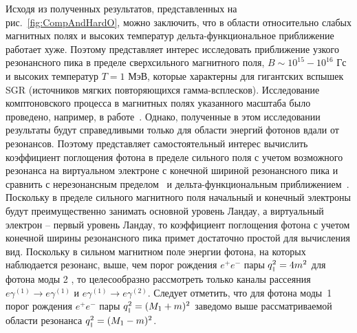 
Исходя из полученных результатов, представленных на рис.~\ref{fig:CompAndHardO}, можно заключить, что в области относительно слабых магнитных полях и высоких температур дельта-функциональное приближение работает хуже. Поэтому представляет интерес исследовать приближение узкого резонансного пика в пределе сверхсильного магнитного поля, \mbox{$B\sim 
10^{15}-10^{16}$} Гс и высоких температур $T=1$ МэВ, которые характерны для 
гигантских вспышек SGR (источников мягких повторяющихся гамма-всплесков).  
Исследование комптоновского процесса в магнитных полях указанного масштаба было 
проведено, например, в работе~\cite{Chistyakov:2009}. Однако, полученные в этом 
исследовании результаты будут справедливыми только для области энергий фотонов 
вдали от резонансов. Поэтому представляет самостоятельный интерес вычислить 
коэффициент поглощения фотона в пределе сильного поля с учетом возможного 
резонанса на виртуальном электроне с конечной шириной резонансного пика и 
сравнить с нерезонансным пределом~\cite{Chistyakov:2009} и 
дельта-функциональным приближением~\cite{Rumyantsev:2017}. Поскольку в пределе 
сильного магнитного поля начальный и конечный электроны будут преимущественно 
занимать основной уровень Ландау, а виртуальный электрон -- первый уровень 
Ландау, то коэффициент поглощения фотона с учетом конечной ширины резонансного 
пика примет достаточно простой для вычисления вид. Поскольку в сильном 
магнитном поле энергии фотона, на которых наблюдается резонанс, 
выше, чем порог рождения $e^+e^-$ пары $q_{\mbox{\tiny $\|$}}^2=4m^2$ для фотона моды 2 , 
то целесообразно рассмотреть только каналы рассеяния $e\gamma^{(1)}\to 
e\gamma^{(1)}$ и $e\gamma^{(1)}\to e\gamma^{(2)}$. Следует отметить, что для 
фотона моды~1 порог рождения $e^+e^-$ пары $q_{\mbox{\tiny $\|$}}^2=(M_1+m)^2$ заведомо 
выше рассматриваемой области резонанса $q_{\mbox{\tiny $\|$}}^2=(M_1-m)^2$.

